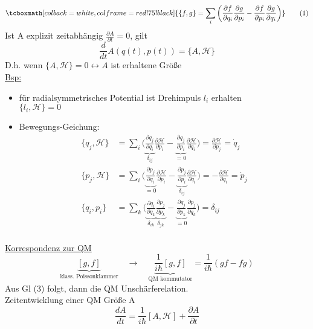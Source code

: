 \documentclass[titlepage,12pt,a4paper,ngerman]{report}
\newcommand{\tx}[1]{\textrm{#1}}
\newcommand{\ub}[1]{\underbrace{#1}}
\newcommand{\ham}{\mathcal{H}}
\newcommand{\rmbox}[1]{\tcboxmath[colback=white,colframe=red!75!black]{#1}} %
\begin{document}
\begin{equation*}
\rmbox{ \{ f,g \} = \sum_i \bigg( \frac{\partial f}{\partial q_i} \frac{\partial g}{\partial p_i} - \frac{\partial f}{\partial p_i} \frac{\partial g}{\partial q_i} \bigg) } \tag{1}
\end{equation*}
Ist A explizit zeitabhängig $ \frac{\partial A}{\partial t} = 0 $, gilt
\begin{equation*}
\frac{d}{dt} A(q(t),p(t)) = \{A,\ham\} \tag{2}
\end{equation*}
D.h. wenn $ \{A,\ham\} = 0 \leftrightarrow A $ ist erhaltene Größe\\
\underline{Bsp:}
\begin{itemize}
	\item für radialsymmetrisches Potential ist Drehimpuls $ l_i $ erhalten\\
	$ \{l_i , \ham \} = 0 $
	\item Bewegungs-Geichung:\\
	\begin{align*}
	\{q_j,\ham \} &= \sum_i\bigg( \ub{\frac{\partial q_j}{\partial q_i}}_{\delta_{ij}} \frac{\partial \ham}{\partial p_i} - \ub{\frac{\partial q_j}{\partial p_i}}_{= 0} \frac{\partial \ham}{\partial q_i} \bigg) = \frac{\partial \ham}{\partial p_j} = \dot{q}_j\\
	\{p_j,\ham \} &= \sum_i\bigg( \ub{\frac{\partial p_j}{\partial q_i}}_{= 0} \frac{\partial \ham}{\partial p_i} - \ub{\frac{\partial p_j}{\partial p_i}}_{\delta_{ij}} \frac{\partial \ham}{\partial q_i} \bigg) = -\frac{\partial \ham}{\partial q_i} = \dot{p}_j\\
	\{q_i,p_i\} &= \sum_k \bigg( \ub{\frac{\partial q_i}{\partial q_k}}_{\delta_{ik}} \ub{\frac{\partial p_j}{\partial p_k}}_{\delta_{jk}} - \ub{\frac{\partial q_j}{\partial p_k}}_{= 0} \frac{\partial p_j}{\partial q_k} \bigg) = \delta_{ij}\\
	\end{align*}
\end{itemize}
\underline{Korrespondenz zur QM}
\begin{equation*}
\ub{[g,f]}_{\tx{klass. Poissonklammer}} \quad \longrightarrow \quad \ub{\frac{1}{i \hbar} [g,f]}_{\tx{QM kommutator}} = \frac{1}{i\hbar} (gf-fg) \tag{4}
\end{equation*}
Aus Gl (3) folgt, dann die QM Unschärferelation.\\
Zeitentwicklung einer QM Größe A
\begin{equation*}
\frac{d A}{d t} = \frac{1}{i \hbar} [A,\ham] + \frac{\partial A}{\partial t} 
\end{equation*}
\end{document}
